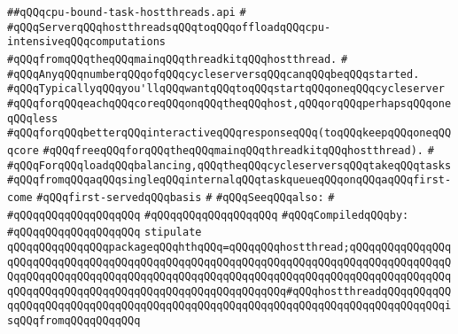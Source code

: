 \label{src/lib/std/src/hostthread/cpu-bound-task-hostthreads.api}
\verb|##qQQqcpu-bound-task-hostthreads.api|\newline
\verb|#|\newline
\verb|#qQQqServerqQQqhostthreadsqQQqtoqQQqoffloadqQQqcpu-intensiveqQQqcomputations|\newline
\verb|#qQQqfromqQQqtheqQQqmainqQQqthreadkitqQQqhostthread.|\newline
\verb|#|\newline
\verb|#qQQqAnyqQQqnumberqQQqofqQQqcycleserversqQQqcanqQQqbeqQQqstarted.|\newline
\verb|#qQQqTypicallyqQQqyou'llqQQqwantqQQqtoqQQqstartqQQqoneqQQqcycleserver|\newline
\verb|#qQQqforqQQqeachqQQqcoreqQQqonqQQqtheqQQqhost,qQQqorqQQqperhapsqQQqoneqQQqless|\newline
\verb|#qQQqforqQQqbetterqQQqinteractiveqQQqresponseqQQq(toqQQqkeepqQQqoneqQQqcore|\newline
\verb|#qQQqfreeqQQqforqQQqtheqQQqmainqQQqthreadkitqQQqhostthread).|\newline
\verb|#|\newline
\verb|#qQQqForqQQqloadqQQqbalancing,qQQqtheqQQqcycleserversqQQqtakeqQQqtasks|\newline
\verb|#qQQqfromqQQqaqQQqsingleqQQqinternalqQQqtaskqueueqQQqonqQQqaqQQqfirst-come|\newline
\verb|#qQQqfirst-servedqQQqbasis|\newline
\verb|#|\newline
\verb|#qQQqSeeqQQqalso:|\newline
\verb|#|\newline
\verb|#qQQqqQQqqQQqqQQqqQQq|\newline
\verb|#qQQqqQQqqQQqqQQqqQQq|\newline
\newline
\verb|#qQQqCompiledqQQqby:|\newline
\verb|#qQQqqQQqqQQqqQQqqQQq|\newline
\newline
\newline
\verb|stipulate|\newline
\verb|qQQqqQQqqQQqqQQqpackageqQQqhthqQQq=qQQqqQQqhostthread;qQQqqQQqqQQqqQQqqQQqqQQqqQQqqQQqqQQqqQQqqQQqqQQqqQQqqQQqqQQqqQQqqQQqqQQqqQQqqQQqqQQqqQQqqQQqqQQqqQQqqQQqqQQqqQQqqQQqqQQqqQQqqQQqqQQqqQQqqQQqqQQqqQQqqQQqqQQqqQQqqQQqqQQqqQQqqQQqqQQqqQQqqQQqqQQqqQQqqQQq#qQQqhostthreadqQQqqQQqqQQqqQQqqQQqqQQqqQQqqQQqqQQqqQQqqQQqqQQqqQQqqQQqqQQqqQQqqQQqqQQqqQQqqQQqisqQQqfromqQQqqQQqqQQq|\newline
